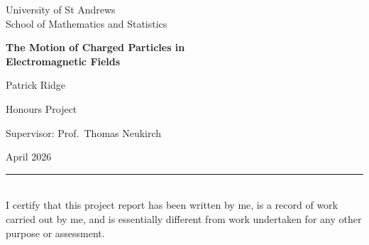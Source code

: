 \documentclass[12pt,a4paper]{report}
\begin{document}
\begin{titlepage}
  \centering
  \vspace*{2cm}
  {\large University of St Andrews\\
   School of Mathematics and Statistics\par}
  \vspace{3cm}
  {\LARGE\bfseries The Motion of Charged Particles in\\
   Electromagnetic Fields\par}
  \vspace{2cm}
  {\large Patrick Ridge\par}
  \vspace{1cm}
  {\large Honours Project\par}
  \vspace{1.5cm}
  {\large Supervisor: Prof.\ Thomas Neukirch\par}
  \vspace{1cm}
  {\large April 2026\par}
  \vfill
  \rule{\textwidth}{0.4pt}\\
  \vspace{0.5cm}
  {\small I certify that this project report has been written by me,
   is a record of work carried out by me, and is essentially different
   from work undertaken for any other purpose or assessment.}
\end{titlepage}

\begin{abstract}
  
\end{abstract}
\newpage
\tableofcontents
\newpage
{}












\end{document}

